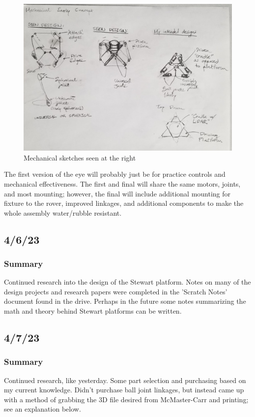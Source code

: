 \documentclass[a4paper, 10pt]{article}
\begin{document}
		\begin{figure} [h]
			\centering
			\includegraphics[scale=0.2]{early_mechanical}
			\caption{Mechanical sketches seen at the right}
			\label{basic_mechanical}
		\end{figure}
	
		The first version of the eye will probably just be for practice controls and mechanical effectiveness. The first and final will share the same motors, joints, and most mounting; however, the final will include additional mounting for fixture to the rover, improved linkages, and additional components to make the whole assembly water/rubble resistant. 
		
	\subsection{4/6/23}
		\subsubsection{Summary}
		Continued research into the design of the Stewart platform. Notes on many of the design projects and research papers were completed in the 'Scratch Notes' document found in the drive. Perhaps in the future some notes summarizing the math and theory behind Stewart platforms can be written.
	
	\subsection{4/7/23}
		\subsubsection{Summary}
		Continued research, like yesterday. Some part selection and purchasing based on my current knowledge. Didn't purchase ball joint linkages, but instead came up with a method of grabbing the 3D file desired from McMaster-Carr and printing; see an explanation below.
		
\end{document}
